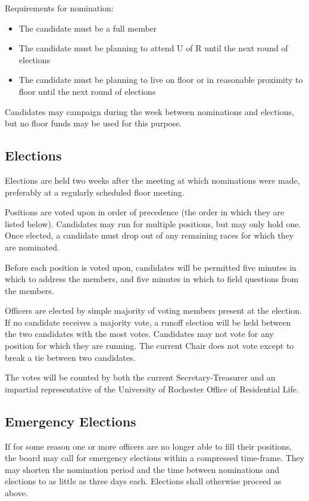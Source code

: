 \documentclass[12pt]{amsart}
\begin{document}
	Requirements for nomination:
	\begin{itemize}
		\item The candidate must be a full member
		\item The candidate must be planning to attend U of R until the next round of elections
		\item The candidate must be planning to live on floor or in reasonable proximity to floor until the next round of elections
	\end{itemize}

	Candidates may campaign during the week between nominations and elections, but no floor funds may be used for this purpose.
	\subsection {Elections}
	Elections are held two weeks after the meeting at which nominations were made, preferably at a regularly scheduled floor meeting. 

	Positions are voted upon in order of precedence (the order in which they are listed below). Candidates may run for multiple positions, but may only hold one. Once elected, a candidate must drop out of any remaining races for which they are nominated.

	Before each position is voted upon, candidates will be permitted five minutes in which to address the members, and five minutes in which to field questions from the members.

	Officers are elected by simple majority of voting members present at the election. If no candidate receives a majority vote, a runoff election will be held between the two candidates with the most votes. Candidates may not vote for any position for which they are running. The current Chair does not vote except to break a tie between two candidates.

	The votes will be counted by both the current Secretary-Treasurer and an impartial representative of the University of Rochester Office of Residential Life.
	\subsection {Emergency Elections}
	If for some reason one or more officers are no longer able to fill their positions, the board may call for emergency elections within a compressed time-frame. They may shorten the nomination period and the time between nominations and elections to as little as three days each. Elections shall otherwise proceed as above.
\end{document}
